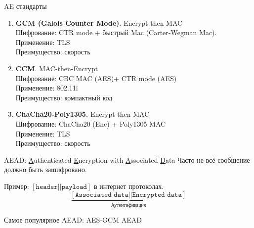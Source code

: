 \documentclass[usenames,dvipsnames,8pt,aspectratio=169]{beamer}
\begin{document}
\begin{frame}{AE стандарты}
\LARGE
\begin{enumerate}
 pt
\item \textbf{GCM (Galois Counter Mode)}. {\Large {\color{Orange}Encrypt-then-MAC}  \\
Шифрование: CTR mode + быстрый Mac (Carter-Wegman Mac).  \\
Применение: TLS \\
Преимущество: скорость
}
\pause
\item \textbf{CCM}.  {\Large {\color{Orange}MAC-then-Encrypt}  \\
Шифрование: CBC MAC (AES)+ CTR mode (AES)  \\
Применение: 802.11i \\
Преимущество: компактный код
}
\pause
\item \textbf{ChaCha20-Poly1305.} {\Large {\color{Orange} Encrypt-then-MAC}  \\
Шифрование: ChaCha20 (Enc) + Poly1305 MAC \\
Применение: TLS \\
Преимущество: скорость
}
\end{enumerate}
\end{frame}

\begin{frame}{AEAD: \underline{A}uthenticated \underline{E}ncryption with \underline{A}ssociated \underline{D}ata }
\Large
Часто не всё сообщение должно быть зашифровано.

\vspace{15pt}

Пример: $[\texttt{header} || \texttt{payload} ]$ в интернет протоколах.\\

\LARGE
\[
\underbrace{
	\left[
	\texttt{Associated data} ||
	\texttt{Encrypted data}
	\right]
}_\text{Аутентификация}
\]



\vspace{25pt}

Самое популярное AEAD: {\color{Orange}AES-GCM AEAD}

\end{frame}
\end{document}
